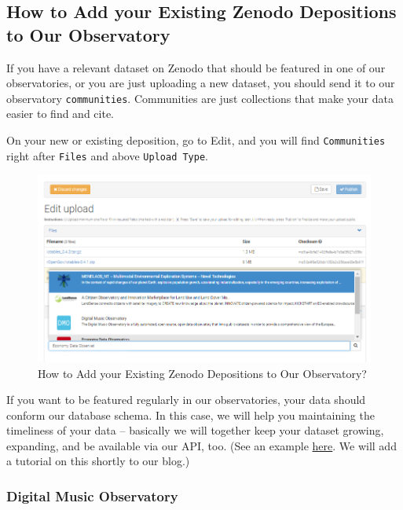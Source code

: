 \documentclass[
  a4paper,
  openany, a4paper, oneside]{book}
\begin{document}
\hypertarget{how-to-add-your-existing-zenodo-depositions-to-our-observatory}{%
\subsection{How to Add your Existing Zenodo Depositions to Our Observatory}\label{how-to-add-your-existing-zenodo-depositions-to-our-observatory}}

If you have a relevant dataset on Zenodo that should be featured in one of our observatories, or you are just uploading a new dataset, you should send it to our observatory \texttt{communities}. Communities are just collections that make your data easier to find and cite.

On your new or existing deposition, go to Edit, and you will find \texttt{Communities} right after \texttt{Files} and above \texttt{Upload\ Type}.

\begin{figure}

{\centering \includegraphics[width=0.85\linewidth]{plots/screenshots/zenodo_how_to_add} 

}

\caption{How to Add your Existing Zenodo Depositions to Our Observatory?}\label{fig:how-to-add-zenodo}
\end{figure}

If you want to be featured regularly in our observatories, your data should conform our database schema. In this case, we will help you maintaining the timeliness of your data -- basically we will together keep your dataset growing, expanding, and be available via our API, too. (See an example \href{http://34.226.91.55}{here}. We will add a tutorial on this shortly to our blog.)

\hypertarget{digital-music-observatory}{%
\subsubsection{Digital Music Observatory}\label{digital-music-observatory}}
\end{document}
